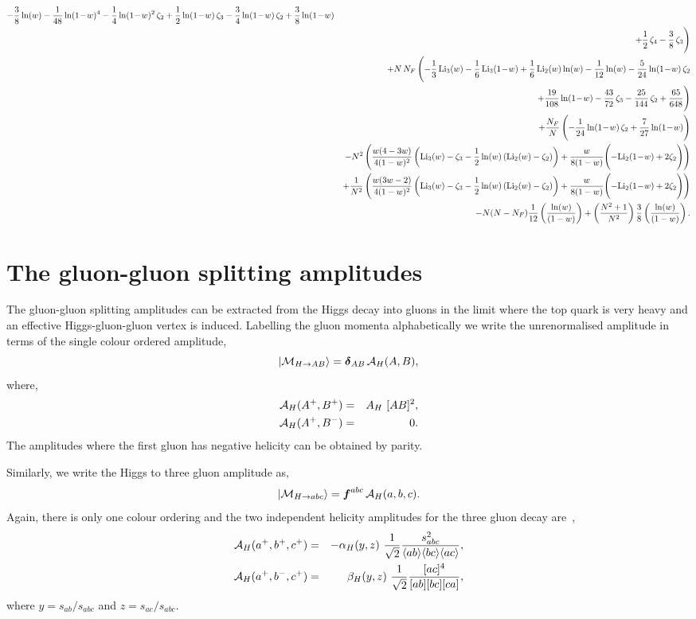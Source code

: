 \documentclass[paper,notoc,nohyper]{JHEP3}
\def\bom#1{{\mbox{\boldmath $#1$}}}
\def\NF{N_F}
\def\lx{\ln(w)}
\def\ly{\ln(1\!-\!w)}
\def\Libx{{\rm Li}_2(w)}
\def\Licx{{\rm Li}_3(w)}
\def\Liby{{\rm Li}_2(1\!-\!w)}
\def\Licy{{\rm Li}_3(1\!-\!w)}
\def\AAAXXX{\Licx-\zeta_3-\frac{1}{2}\lx\left(\Libx-\zeta_2\right)}
\def\AAAYYY{-\Liby+2\zeta_2}
\begin{document}
\begin{eqnarray}
-{3\over 8}\,{\lx}-{1\over 48}\,{\ly^4}-{1\over 4}\,{\ly^2}\,{\zeta_2}+{1\over 2}\,{\ly}\,{\zeta_3}-{3\over 4}\,{\ly}\,{\zeta_2}+{3\over 8}\,{\ly}\nonumber \\&&
+{1\over 2}\,{\zeta_4}-{3\over 8}\,{\zeta_3}\Biggr )\nonumber \\&&
+{N}\,{\NF}\,\Biggl (-{1\over 3}\,{\Licx}-{1\over 6}\,{\Licy}+{1\over 6}\,{\Libx}\,{\lx}-{1\over 12}\,{\lx}-{5\over 24}\,{\ly}\,{\zeta_2}\nonumber \\&&
+{19\over 108}\,{\ly}-{43\over 72}\,{\zeta_3}-{25\over 144}\,{\zeta_2}+{65\over 648}\Biggr )\nonumber \\&&
+{\NF\over N}\,\Biggl (-{1\over 24}\,{\ly}\,{\zeta_2}+{7\over 27}\,{\ly}\Biggr )\nonumber \\&&
-N^2\left(\frac{w(4-3w)}{4(1-w)^2}\left(\AAAXXX\right)
+\frac{w}{8(1-w)}\Biggl(\AAAYYY\Biggr)\right)\nonumber \\&&
+\frac{1}{N^2}\left(\frac{w(3w-2)}{4(1-w)^2}\left(\AAAXXX\right)
+\frac{w}{8(1-w)}\Biggl(\AAAYYY\Biggr)\right)\nonumber \\&&
-N(N-\NF)\frac{1}{12}\left(\frac{\lx}{(1-w)}\right)
+\left(\frac{N^2+1}{N^2}\right)\frac{3}{8}\left(\frac{\lx}{(1-w)}\right).
\end{eqnarray}

\section{The gluon-gluon splitting amplitudes}
\label{sec:gluongluon}

The gluon-gluon splitting amplitudes can be extracted from
the Higgs decay into gluons in the limit where the top quark is very heavy and an 
effective Higgs-gluon-gluon vertex is induced.
Labelling the gluon momenta alphabetically we write the unrenormalised amplitude in terms of
the single colour ordered amplitude,
\begin{equation}
|{\cal M}_{H \to A B }\rangle = {\bom \delta_{AB}} \,{\cal A}_H(A,B),
\end{equation}
where,
\begin{eqnarray}
\label{eq:helampHgg}
{\cal A}_H(A^+,B^+)&=& A_H ~[A B]^2,\\
{\cal A}_H(A^+,B^-) &=& 0.
\end{eqnarray}
The amplitudes where the first gluon has negative helicity can be obtained by
parity.

Similarly, we write the Higgs to three gluon amplitude as,
\begin{equation}
|{\cal M}_{H \to a b c} \rangle = {\bom f^{abc}} \, {\cal A}_H(a,b,c).
\end{equation}
Again, there is only one colour ordering 
and the two independent helicity amplitudes for the three gluon decay are~\cite{Schmidt:1997wr,inprep},
\begin{eqnarray}
\label{eq:helamphggg1}
{\cal A}_H( a^+ ,b^+ ,c^+)  &=& -\alpha_H(y,z)
~\frac{1}{\sqrt{2}}\frac{s_{abc}^2}{\langle ab\rangle\langle bc\rangle\langle ac\rangle}
,\\
\label{eq:helamphggg2}
{\cal A}_H(a^+,b^-,c^+) &=& \beta_H(y,z)
~\frac{1}{\sqrt{2}}\frac{[ac]^4}{[ab][bc][ca]}, 
\end{eqnarray}
where $y = s_{ab}/s_{abc}$ and $z = s_{ac}/s_{abc}$.
\end{document}
